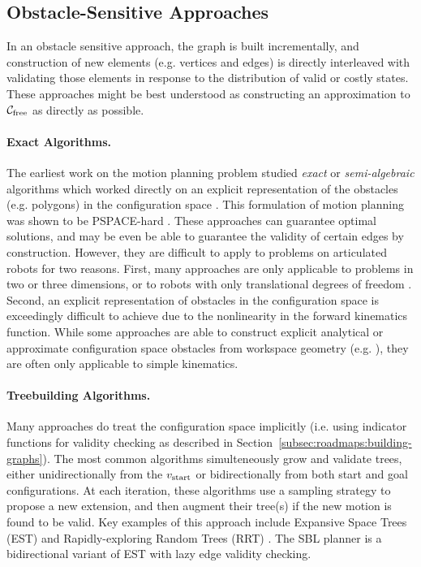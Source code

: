 \subsection{Obstacle-Sensitive Approaches}
\label{subsec:roadmaps:sensitive}

In an obstacle sensitive approach,
the graph is built incrementally,
and construction of new elements (e.g. vertices and edges)
is directly interleaved with validating those elements
in response to the distribution of valid or costly states.
These approaches might be best understood
as constructing an approximation to $\mathcal{C}_{\mbox{\scriptsize free}}$
as directly as possible.

\paragraph{Exact Algorithms.}
The earliest work on the motion planning problem studied
\emph{exact} or \emph{semi-algebraic}
algorithms which worked directly on an explicit representation
of the obstacles (e.g. polygons) in the configuration space
\citep{lozanoperez1983cspace}.
This formulation of motion planning was shown to be
PSPACE-hard \citep{reif1979moverscomplexity,canny1988complexitymotionplanning}.
These approaches can guarantee optimal solutions,
and may be even be able to guarantee the validity of certain edges
by construction.
However,
they are difficult to apply to problems on articulated
robots for two reasons.
First, many approaches are only applicable to problems
in two or three dimensions,
or to robots with only translational degrees of freedom
\citep{kavraki1995cspacefft}.
Second, an explicit representation of obstacles in the
configuration space is exceedingly difficult to achieve due to the
nonlinearity in the forward kinematics function.
While some approaches are able to construct explicit
analytical or approximate configuration space obstacles from
workspace geometry (e.g. \citep{newmanbranicky1991cspacetransforms}),
they are often only applicable to simple kinematics.

\paragraph{Treebuilding Algorithms.}
Many approaches do treat the configuration space implicitly
(i.e. using indicator functions for validity checking as described
in Section~\ref{subsec:roadmaps:building-graphs}).
The most common algorithms simulteneously grow and validate trees,
either unidirectionally from the $v_{\mbox{\scriptsize start}}$ or bidirectionally
from both start and goal configurations.
At each iteration,
these algorithms use a sampling strategy to propose a new extension,
and then augment their tree(s) if the new motion is found to be valid.
Key examples of this approach include
Expansive Space Trees (EST) \citep{hsu1997expansive}
and Rapidly-exploring Random Trees (RRT)
\citep{lavalle1998rrt, kuffner2000rrtconnect}.
The SBL planner \citep{sanchezante2001sbl}
is a bidirectional variant of EST with lazy edge validity checking.

